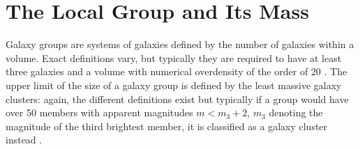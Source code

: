 \documentclass[english, oneside]{HYgradu}
\begin{document}






\section{The Local Group and Its Mass}
Galaxy groups are systems of galaxies defined by the number of galaxies within a volume. Exact definitions vary, but typically they are required to have at least three galaxies and a volume with numerical overdensity of the order of 20 \citep{mo2010galaxy}. The upper limit of the size of a galaxy group is defined by the least massive galaxy clusters: again, the different definitions exist but typically if a group would have over 50 members with apparent magnitudes $m < m_3 +2$, $m_3$ denoting the magnitude of the third brightest member, it is classified as a galaxy cluster instead \citep{mo2010galaxy}.
\end{document}
